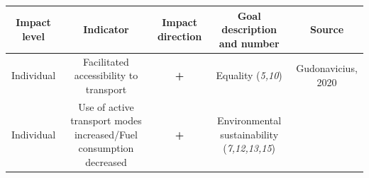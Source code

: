 \documentclass[
]{book}
\begin{document}
\begin{longtable}[]{@{}ccccc@{}}
\toprule
\begin{minipage}[b]{0.17\columnwidth}\centering
Impact level\strut
\end{minipage} & \begin{minipage}[b]{0.16\columnwidth}\centering
Indicator\strut
\end{minipage} & \begin{minipage}[b]{0.17\columnwidth}\centering
Impact direction\strut
\end{minipage} & \begin{minipage}[b]{0.17\columnwidth}\centering
Goal description and number\strut
\end{minipage} & \begin{minipage}[b]{0.17\columnwidth}\centering
Source\strut
\end{minipage}\tabularnewline
\midrule
\endhead
\begin{minipage}[t]{0.17\columnwidth}\centering
Individual\strut
\end{minipage} & \begin{minipage}[t]{0.16\columnwidth}\centering
Facilitated accessibility to transport\strut
\end{minipage} & \begin{minipage}[t]{0.17\columnwidth}\centering
\textbf{+}\strut
\end{minipage} & \begin{minipage}[t]{0.17\columnwidth}\centering
Equality (\emph{5,10})\strut
\end{minipage} & \begin{minipage}[t]{0.17\columnwidth}\centering
Gudonavicius, 2020\strut
\end{minipage}\tabularnewline
\begin{minipage}[t]{0.17\columnwidth}\centering
Individual\strut
\end{minipage} & \begin{minipage}[t]{0.16\columnwidth}\centering
Use of active transport modes increased/Fuel consumption decreased\strut
\end{minipage} & \begin{minipage}[t]{0.17\columnwidth}\centering
\textbf{+}\strut
\end{minipage} & \begin{minipage}[t]{0.17\columnwidth}\centering
Environmental sustainability (\emph{7,12,13,15})\strut
\end{minipage} & \begin{minipage}[t]{0.17\columnwidth}\centering

\end{minipage}
\end{longtable}
\end{document}
